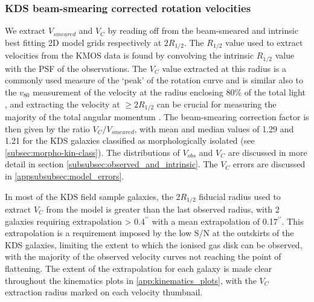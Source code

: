 \documentclass[fleqn,usenatbib]{mn2e}
\begin{document}
\subsubsection{KDS beam-smearing corrected rotation velocities}\label{subsubsec:beam_smearing_corrected_velocities}
We extract $V_{smeared}$ and $V_{C}$ by reading off from the beam-smeared and intrinsic best fitting 2D model grids respectively at $2R_{1/2}$.
The $R_{1/2}$ value used to extract velocities from the KMOS data is found by convolving the intrinsic $R_{1/2}$ value with the PSF of the observations.
The $V_{C}$ value extracted at this radius is a commonly used measure of the `peak' of the rotation curve \citep[e.g.][]{Miller2011,Pelliccia2016,Stott2016,Harrison2017} and is similar also to the $v_{80}$ measurement of the velocity at the radius enclosing 80$\%$ of the total light \citep{Tiley2016a}, and extracting the velocity at $\geqslant 2R_{1/2}$ can be crucial for measuring the majority of the total angular momentum \citep[e.g.]{Obreschkow2015,Harrison2017}.
The beam-smearing correction factor is then given by the ratio $V_{C}/V_{smeared}$, with mean and median values of 1.29 and 1.21 for the KDS galaxies classified as morphologically isolated (see \cref{subsec:morpho-kin-class}).
The distributions of $V_{obs}$ and $V_{C}$ are discussed in more detail in section \cref{subsubsec:observed_and_intrinsic}.
The $V_{C}$ errors are discussed in \cref{appsubsubsec:model_errors}.

In most of the KDS field sample galaxies, the $2R_{1/2}$ fiducial radius used to extract $V_{C}$ from the model is greater than the last observed radius, with 2 galaxies requiring extrapolation > 0.4$^{\prime\prime}$ with a mean extrapolation of 0.17$^{\prime\prime}$.
This extrapolation is a requirement imposed by the low S/N at the outskirts of the KDS galaxies, limiting the extent to which the ionised gas disk can be observed, with the majority of the observed velocity curves not reaching the point of flattening. 
The extent of the extrapolation for each galaxy is made clear throughout the kinematics plots in \cref{app:kinematics_plots}, with the $V_{C}$ extraction radius marked on each velocity thumbnail.
\end{document}
